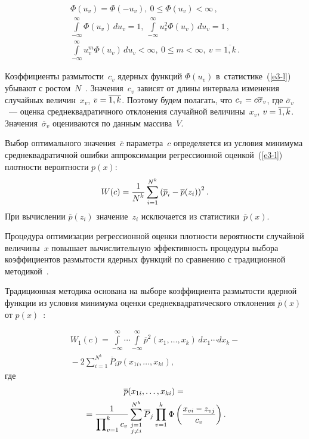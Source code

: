 \begin{multicols}{2}
\begin{enumerate}[1.]
\vspace*{-6pt}

\noindent
\begin{multline*}
\Phi(u_v) =\Phi(-u_v),\ 0\leq \Phi(u_v)<\infty\,,\\
 \int\limits_{-\infty}^\infty 
\Phi(u_v)\,du_v=1,\ \int\limits_{-\infty}^\infty  u_v^2 \Phi(u_v)\,du_v=1\,,\\
\int\limits_{-\infty}^\infty u_v^m \Phi(u_v)\,du_v< \infty,\ 0\leq m< \infty,\ 
v=\overline{1,k}\,.
\end{multline*}
  \end{enumerate}
  
  \vspace*{-6pt}
  
  Коэффициенты размытости~$c_v$ ядерных функций $\Phi (u_v)$ 
в~статистике~(\ref{e3-l}) убывают с ростом~$N$~\cite{10-l}. Значения~$c_v$ 
зависят от длины интервала изменения случайных величин~$x_v$, $v\hm= 
\overline{1,k}$. Поэтому будем полагать, что $c_v\hm= c\overline{\sigma}_v$, 
где $\overline{\sigma}_v$~--- оценка сред\-не\-квад\-ра\-тич\-но\-го отклонения 
случайной величины~$x_v$, $v\hm=\overline{1,k}$. 
Значения~$\overline{\sigma}_v$ оцениваются по данным 
массива~$\overline{V}$.
  
  Выбор оптимального значения~$\overline{c}$ параметра~$c$ определяется из 
условия минимума сред\-не\-квад\-ра\-тич\-ной ошибки аппроксимации регрессионной 
оценкой~(\ref{e3-l}) плотности вероятности $p(x)$:
  $$
  W(c)=\displaystyle\frac{\displaystyle 1\mathstrut}{\displaystyle N^k\mathstrut}\sum\limits_{i=1}^{N^k} \left( \overline{p}_i- 
\overline{p}(z_i)\right)^2.
  $$
  При вычислении $\overline{p}(z_i)$ значение~$z_i$ исключается из 
статистики~$\overline{p}(x)$.
  
  Процедура оптимизации регрессионной оценки плотности вероятности 
случайной величины~$x$ повышает вычислительную эффективность 
процедуры выбора коэффициентов размытости ядерных функций по сравнению 
с традиционной методикой~\cite{10-l}.
  
  Традиционная методика основана на выборе коэффициента размытости 
ядерной функции из условия минимума оценки среднеквадратического 
отклонения $\overline{p}(x)$ от $p(x)$~\cite{10-l}:

\pagebreak

\noindent
\begin{multline*}
  W_1(c)=\int\limits_{-\infty}^\infty\! \cdots\! \int\limits_{-\infty}^\infty 
\overline{p}^2(x_1,\ldots , x_k)\,dx_1\cdots  dx_k -{}\\
{}-2\sum\limits^{N^k}_{i=1} 
\overline{P}_i p ( x_{1i},\ldots , x_{ki}),
  \end{multline*}
где
\begin{multline*}
\overline{p} (x_{1i},\ldots , x_{ki})={}\\  
{}= \displaystyle\frac{\displaystyle 1\mathstrut}{\displaystyle \prod\nolimits_{v=1}^k c_v\mathstrut} \sum\limits^{N^k}_{\substack{{j=1}\\ {j\not=i}}}
\overline{P}_j \prod\limits^k_{v=1} \Phi \left( \displaystyle\frac{\displaystyle x_{vi}- z_{vj}\mathstrut}{\displaystyle c_v\mathstrut}\right).
\end{multline*}
  

\end{multicols}
